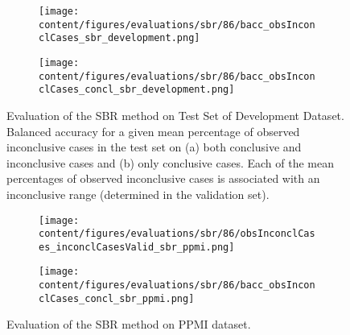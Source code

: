 \begin{figure}[t]
    \begin{subfigure}{0.9\textwidth}
      \centering
      \texttt{[image: content/figures/evaluations/sbr/86/bacc\_obsInconclCases\_sbr\_development.png]}
      \subcaption{}
      \label{fig:bacc_obsInconclCases_sbr_development}
    \end{subfigure}
    \hfill
    \begin{subfigure}{0.9\textwidth}
      \centering
      \texttt{[image: content/figures/evaluations/sbr/86/bacc\_obsInconclCases\_concl\_sbr\_development.png]}
      \subcaption{}
      \label{fig:bacc_obsInconclCases_concl_sbr_development}
    \end{subfigure}

    \caption{Evaluation of the SBR method on Test Set of Development Dataset.
    Balanced accuracy for a given mean percentage of observed inconclusive cases in the test set on 
    (a) both conclusive and inconclusive cases and (b) only conclusive cases. 
    Each of the mean percentages of observed inconclusive cases is associated with an inconclusive range (determined in the validation set). }
    \label{fig:bacc_obsInconclCases_sbr_development_full}
\end{figure}




\begin{figure}[t]
  \begin{subfigure}{0.9\textwidth}
    \centering
    \texttt{[image: content/figures/evaluations/sbr/86/obsInconclCases\_inconclCasesValid\_sbr\_ppmi.png]}
    \label{fig:obsInconclCases_inconclCasesValid_sbr_ppmi}
  \end{subfigure}
  \hfill
  \begin{subfigure}{0.9\textwidth}
    \centering
    \texttt{[image: content/figures/evaluations/sbr/86/bacc\_obsInconclCases\_concl\_sbr\_ppmi.png]}
    \label{fig:bacc_obsInconclCases_concl_sbr_ppmi}
  \end{subfigure}
  \caption{Evaluation of the SBR method on PPMI dataset.}
\end{figure}



